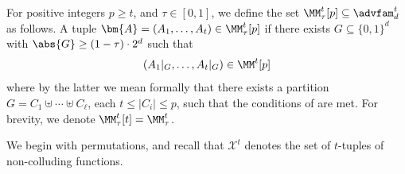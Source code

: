 \begin{definition}\label{def:smooth inv}
	For positive integers $p \ge t$, and $\tau \in [0,1]$, we define the 
	set $\MM_\tau^t[p] \subseteq \advfam_d^t$ as follows. A tuple $
	\bm{A} =(A_1,\ldots,A_t) \in \MM_\tau^t[p]$ if there exists $G 
	\subseteq \{0,1\}^d$ with $\abs{G} \geq (1-\tau)\cdot2^d$ such that 
\[
\left( A_1|_G,\ldots,A_t|_G \right) \in \MM^t[p]
\]
where by the latter we mean formally that there exists a partition $G = C_1 \uplus \cdots \uplus C_\ell$, each $t \le |C_i| \le p$, such that
the conditions of  are met. For brevity, we denote $\MM_{\tau}^t[t] = \MM_\tau^t$.
%
\end{definition}

We begin with permutations, and recall that $\mathcal{X}^{t}$ denotes the set of $t$-tuples of non-colluding functions.

